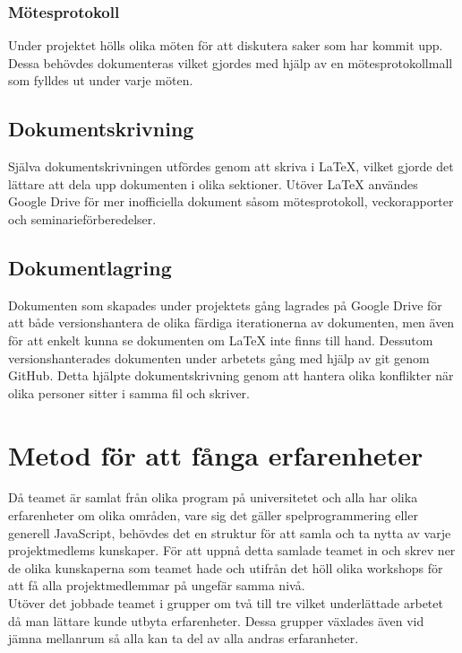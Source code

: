 \subsubsection*{Mötesprotokoll}
Under projektet hölls olika möten för att diskutera saker som har kommit upp. Dessa behövdes dokumenteras vilket gjordes med hjälp av en mötesprotokollmall som fylldes ut under varje möten.

\subsection{Dokumentskrivning}
Själva dokumentskrivningen utfördes genom att skriva i LaTeX, vilket gjorde det lättare att dela upp dokumenten i olika sektioner. Utöver LaTeX användes Google Drive för mer inofficiella dokument såsom mötesprotokoll, veckorapporter och seminarieförberedelser.

\subsection{Dokumentlagring}
Dokumenten som skapades under projektets gång lagrades på Google Drive för att både versionshantera de olika färdiga iterationerna av dokumenten, men även för att enkelt kunna se dokumenten om LaTeX inte finns till hand. Dessutom versionshanterades dokumenten under arbetets gång med hjälp av git genom GitHub. Detta hjälpte dokumentskrivning genom att hantera olika konflikter när olika personer sitter i samma fil och skriver.

\section{Metod för att fånga erfarenheter}
Då teamet är samlat från olika program på universitetet och alla har olika erfarenheter om olika områden, vare sig det gäller spelprogrammering eller generell JavaScript, behövdes det en struktur för att samla och ta nytta av varje projektmedlems kunskaper. För att uppnå detta samlade teamet in och skrev ner de olika kunskaperna som teamet hade och utifrån det höll olika workshops för att få alla projektmedlemmar på ungefär samma nivå.
\\
Utöver det jobbade teamet i grupper om två till tre vilket underlättade arbetet då man lättare kunde utbyta erfarenheter. Dessa grupper växlades även vid jämna mellanrum så alla kan ta del av alla andras erfaranheter.
